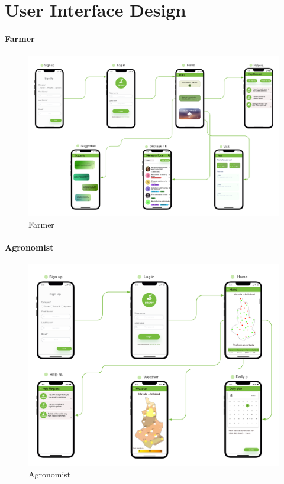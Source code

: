 \chapter{User Interface Design}




\subsubsection{Farmer}

\begin{figure}[H]
   \centering
  \centerline{\includegraphics[width=150mm,scale=0.9]{./Images//Mocks/Mobile_farmer/Blank diagram.png}}
  \caption{Farmer}
\end{figure}


\subsubsection{Agronomist}

\begin{figure}[H]
   \centering
  \centerline{\includegraphics[width=150mm,scale=0.9]{./Images//Mocks/Mobile_agronomist/Agronomist.png}}
  \caption{Agronomist}
\end{figure}